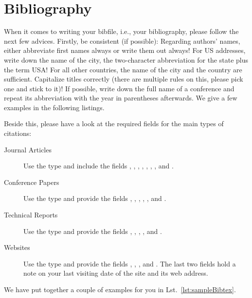 \section{Bibliography}\label{sec:bib}

When it comes to writing your bibfile, i.e., your bibliography, please follow the next few advices. Firstly, be consistent (if possible): Regarding authors' names, either abbreviate first names always or write them out always! For US addresses, write down the name of the city, the two-character abbreviation for the state plus the term USA! For all other countries, the name of the city and the country are sufficient. Capitalize titles correctly (there are multiple rules on this, please pick one and stick to it)! If possible, write down the full name of a conference and repeat its abbreviation with the year in parentheses afterwards. We give a few examples in the following listings.

Beside this, please have a look at the required fields for the main types of citations:
\begin{description}
  \item[Journal Articles] Use the type  and include the fields , , , , , , , and .
  \item[Conference Papers] Use the type  and provide the fields , , , , , and .
  \item[Technical Reports] Use the type  and provide the fields , , , , and .
  \item[Websites] Use the type  and provide the fields , , ,  and . The last two fields hold a note on your last visiting date of the site and its web address.
\end{description}

We have put together a couple of examples for you in Lst.~\ref{lst:sampleBibtex}.

